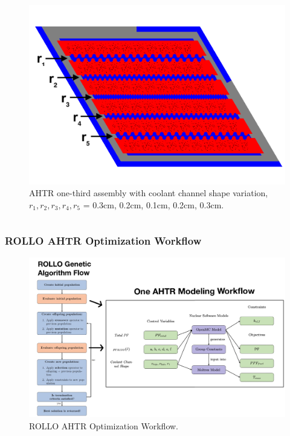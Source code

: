 \begin{frame}
\begin{columns}
\begin{column}{0.5\textwidth}
\begin{figure}
                \includegraphics[width=\linewidth]{../docs/figures/coolant-channel-shape-assem.png} 
                \caption{AHTR one-third assembly with coolant channel shape variation, 
                $r_1, r_2, r_3, r_4, r_5$ = 0.3cm, 0.2cm, 0.1cm, 0.2cm, 0.3cm.}
            \end{figure}
        \end{column}
        \end{columns}
\end{frame}

\begin{frame}
    \frametitle{ROLLO AHTR Optimization Workflow}
    \begin{figure}
        \includegraphics[width=0.9\linewidth]{figures/ahtr-modeling-workflow.png} 
        \caption{ROLLO AHTR Optimization Workflow.}
    \end{figure}
\end{frame}

